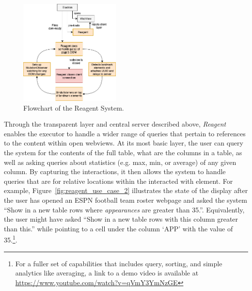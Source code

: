 \begin{figure}
\centering
\includegraphics[width=0.45\textwidth]{chapters/03_reagent/figures/reagent.png}
\caption{Flowchart of the Reagent System.}
\label{fig:reagent}
\end{figure}

Through the transparent layer and central server described above, \textit{Reagent} enables
the executor to handle a wider range of queries that pertain to references
to the content within open webviews. At its most basic layer, the user can
query the system for the contents of the full table, what are the columns in a
table, as well as asking queries about statistics (e.g. max, min, or average)
of any given column. By capturing the interactions, it then allows the system
to handle queries that are for relative locations within the interacted with
element. For example, Figure~\ref{fig:reagent_use_case_2} illustrates the state of the
display after the user has opened an ESPN football team roster webpage and
asked the system ``Show in a new table rows where \textit{appearances} are
greater than 35.''. Equivalently, the user might have asked ``Show in a new
table rows with this column greater than this.'' while pointing to a cell
under the column `APP' with the value of 35.\footnote{For a fuller set of
capabilities that includes query, sorting, and simple analytics like averaging,
a link to a demo video is available at 
\url{https://www.youtube.com/watch?v=qVmY3YmNzGE}}.
